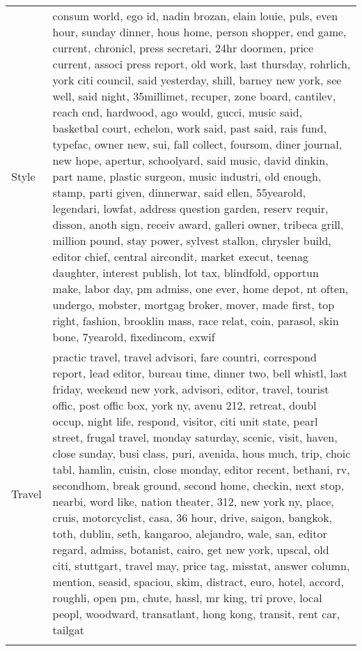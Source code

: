 \begin{longtable}{p{}p{}}
  Style & consum world, ego id, nadin brozan, elain louie, puls, even hour, sunday dinner, hous home, person shopper, end game, current, chronicl, press secretari, 24hr doormen, price current, associ press report, old work, last thursday, rohrlich, york citi council, said yesterday, shill, barney new york, see well, said night, 35millimet, recuper, zone board, cantilev, reach end, hardwood, ago would, gucci, music said, basketbal court, echelon, work said, past said, rais fund, typefac, owner new, sui, fall collect, foursom, diner journal, new hope, apertur, schoolyard, said music, david dinkin, part name, plastic surgeon, music industri, old enough, stamp, parti given, dinnerwar, said ellen, 55yearold, legendari, lowfat, address question garden, reserv requir, disson, anoth sign, receiv award, galleri owner, tribeca grill, million pound, stay power, sylvest stallon, chrysler build, editor chief, central aircondit, market execut, teenag daughter, interest publish, lot tax, blindfold, opportun make, labor day, pm admiss, one ever, home depot, nt often, undergo, mobster, mortgag broker, mover, made first, top right, fashion, brooklin mass, race relat, coin, parasol, skin bone, 7yearold, fixedincom, exwif \\ 
  Travel & practic travel, travel advisori, fare countri, correspond report, lead editor, bureau time, dinner two, bell whistl, last friday, weekend new york, advisori, editor, travel, tourist offic, post offic box, york ny, avenu 212, retreat, doubl occup, night life, respond, visitor, citi unit state, pearl street, frugal travel, monday saturday, scenic, visit, haven, close sunday, busi class, puri, avenida, hous much, trip, choic tabl, hamlin, cuisin, close monday, editor recent, bethani, rv, secondhom, break ground, second home, checkin, next stop, nearbi, word like, nation theater, 312, new york ny, place, cruis, motorcyclist, casa, 36 hour, drive, saigon, bangkok, toth, dublin, seth, kangaroo, alejandro, wale, san, editor regard, admiss, botanist, cairo, get new york, upscal, old citi, stuttgart, travel may, price tag, misstat, answer column, mention, seasid, spaciou, skim, distract, euro, hotel, accord, roughli, open pm, chute, hassl, mr king, tri prove, local peopl, woodward, transatlant, hong kong, transit, rent car, tailgat \\ 
   \hline
\hline
\label{tab:top_100_hard}
\end{longtable}
\endgroup
